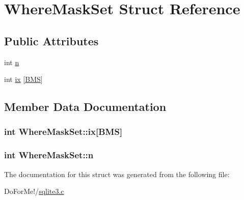 \hypertarget{struct_where_mask_set}{\section{Where\-Mask\-Set Struct Reference}
\label{struct_where_mask_set}
}
\subsection*{Public Attributes}
\begin{DoxyCompactItemize}
\item 
int \hyperlink{struct_where_mask_set_a09923e1dee2157c78c5ae0df65e8ee7c}{n}
\item 
int \hyperlink{struct_where_mask_set_a9de4e7b27d4f793f37c1ead7b44ecb48}{ix} \mbox{[}\hyperlink{sqlite3_8c_a61ebf73c36e0aa88593c8fdb76891407}{B\-M\-S}\mbox{]}
\end{DoxyCompactItemize}


\subsection{Member Data Documentation}
\hypertarget{struct_where_mask_set_a9de4e7b27d4f793f37c1ead7b44ecb48}{
\subsubsection[{ix}]{\setlength{\rightskip}{0pt plus 5cm}int Where\-Mask\-Set\-::ix\mbox{[}{\bf B\-M\-S}\mbox{]}}}\label{struct_where_mask_set_a9de4e7b27d4f793f37c1ead7b44ecb48}
\hypertarget{struct_where_mask_set_a09923e1dee2157c78c5ae0df65e8ee7c}{
\subsubsection[{n}]{\setlength{\rightskip}{0pt plus 5cm}int Where\-Mask\-Set\-::n}}\label{struct_where_mask_set_a09923e1dee2157c78c5ae0df65e8ee7c}


The documentation for this struct was generated from the following file\-:\begin{DoxyCompactItemize}
\item 
Do\-For\-Me!/\hyperlink{sqlite3_8c}{sqlite3.\-c}\end{DoxyCompactItemize}
